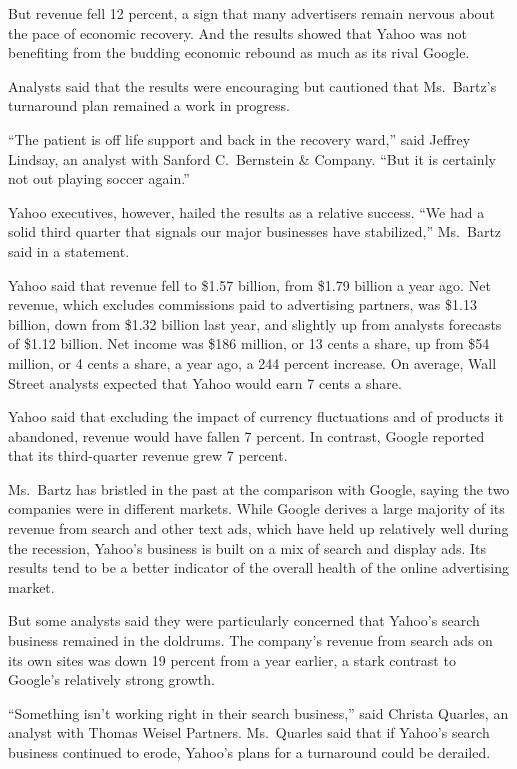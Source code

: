 ﻿\documentclass[12pt]{article}
\begin{document}
But revenue fell 12 percent, a sign that many advertisers remain nervous about the pace of economic
recovery. And the results showed that Yahoo was not benefiting from the budding economic rebound as
much as its rival Google.

Analysts said that the results were encouraging but cautioned that Ms.~Bartz's turnaround plan
remained a work in progress.

``The patient is off life support and back in the recovery ward,'' said Jeffrey Lindsay, an analyst
with Sanford C.~Bernstein \& Company. ``But it is certainly not out playing soccer again.''

Yahoo executives, however, hailed the results as a relative success. ``We had a solid third quarter
that signals our major businesses have stabilized,'' Ms.~Bartz said in a statement.

Yahoo said that revenue fell to \$1.57 billion, from \$1.79 billion a year ago. Net revenue, which
excludes commissions paid to advertising partners, was \$1.13 billion, down from \$1.32 billion last
year, and slightly up from analysts forecasts of \$1.12 billion. Net income was \$186 million, or 13
cents a share, up from \$54 million, or 4 cents a share, a year ago, a 244 percent increase. On
average, Wall Street analysts expected that Yahoo would earn 7 cents a share.

Yahoo said that excluding the impact of currency fluctuations and of products it abandoned, revenue
would have fallen 7 percent. In contrast, Google reported that its third-quarter revenue grew 7
percent.

Ms.~Bartz has bristled in the past at the comparison with Google, saying the two companies were in
different markets. While Google derives a large majority of its revenue from search and other text
ads, which have held up relatively well during the recession, Yahoo's business is built on a mix of
search and display ads. Its results tend to be a better indicator of the overall health of the
online advertising market.

But some analysts said they were particularly concerned that Yahoo's search business remained in the
doldrums. The company's revenue from search ads on its own sites was down 19 percent from a year
earlier, a stark contrast to Google's relatively strong growth.

``Something isn't working right in their search business,'' said Christa Quarles, an analyst with
Thomas Weisel Partners. Ms.~Quarles said that if Yahoo's search business continued to erode, Yahoo's
plans for a turnaround could be derailed.
\end{document}
